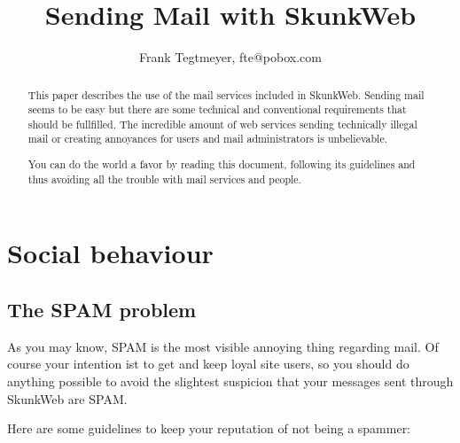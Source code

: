 \documentclass{article}
\author{Frank Tegtmeyer, fte@pobox.com}
\title{Sending Mail with SkunkWeb}
\begin{document}
\maketitle

\begin{abstract}
This paper describes the use of the mail services included in SkunkWeb.
Sending mail seems to be easy but there are some technical and conventional
requirements that should be fullfilled. The incredible amount of web services
sending technically illegal mail or creating annoyances for users and mail
administrators is unbelievable.

You can do the world a favor by reading this document, following its
guidelines and thus avoiding all the trouble with mail services and
people.
\end{abstract}

\newpage
\tableofcontents
\newpage


\section{Social behaviour}

\subsection{The SPAM problem}

As you may know, SPAM is the most visible annoying thing regarding mail.
Of course your intention ist to get and keep loyal site users, so you
should do anything possible to avoid the slightest suspicion that your
messages sent through SkunkWeb are SPAM.

Here are some guidelines to keep your reputation of not being a spammer:
\end{document}
